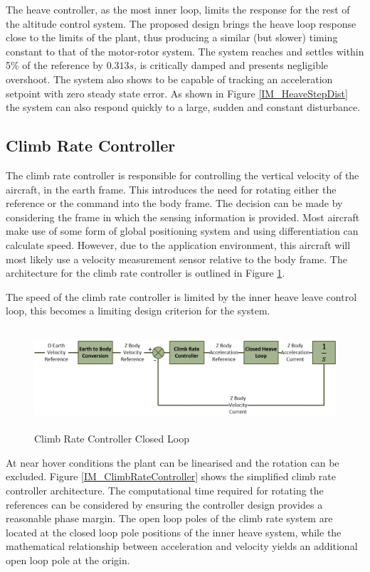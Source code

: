 \documentclass[12pt]{report}
\begin{document}
	The heave controller, as the most inner loop, limits the response for the rest of the altitude control system. The proposed design brings the heave loop response close to the limits of the plant, thus producing a similar (but slower) timing constant to that of the motor-rotor system. The system reaches and settles within 5\% of the reference by $0.313s$, is critically damped and presents negligible overshoot. The system also shows to be capable of tracking an acceleration setpoint with zero steady state error. As shown in Figure \ref{IM_HeaveStepDist} the system can also respond quickly to a large, sudden and constant disturbance.
	
	\subsection{Climb Rate Controller}
	The climb rate controller is responsible for controlling the vertical velocity of the aircraft, in the earth frame. This introduces the need for rotating either the reference or the command into the body frame. The decision can be made by considering the frame in which the sensing information is provided. Most aircraft make use of some form of global positioning system and using differentiation can calculate speed. However, due to the application environment, this aircraft will most likely use a velocity measurement sensor relative to the body frame. The architecture for the climb rate controller is outlined in Figure \ref{IM_ClimbRateControlLoop}. 
	
	The speed of the climb rate controller is limited by the inner heave leave control loop, this becomes a limiting design criterion for the system.
	
	\begin{figure}[H]
		\centering
		\includegraphics[height = 3.75cm]{../References/Diagrams/ClimbRateLoop.jpg}
		\caption{Climb Rate Controller Closed Loop}
		\label{IM_ClimbRateControlLoop}
	\end{figure}
	
	At near hover conditions the plant can be linearised and the rotation can be excluded. Figure \ref{IM_ClimbRateController} shows the simplified climb rate controller architecture. The computational time required for rotating the references can be considered by ensuring the controller design provides a reasonable phase margin. The open loop poles of the climb rate system are located at the closed loop pole positions of the inner heave system, while the mathematical relationship between acceleration and velocity yields an additional open loop pole at the origin.
	
\end{document}
